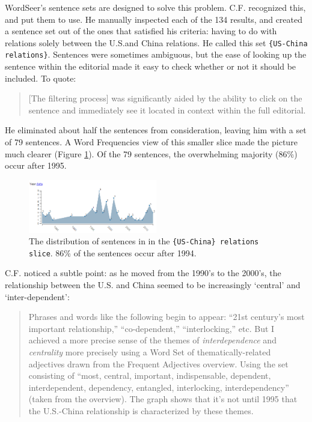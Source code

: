 \documentclass{sig-alternate}
\newcommand{\code}[1] {\texttt{#1}}
\begin{document}
WordSeer's sentence sets are designed to solve this problem. C.F. recognized this, and put them to use. He manually inspected each of the 134 results, and created a sentence set out of the ones that satisfied his criteria: having to do with relations solely between the U.S.and China relations.  He called this set \code{\{US-China relations\}}. Sentences were sometimes ambiguous, but the ease of looking up the sentence within the editorial made it easy to check whether or not it should be included. To quote:
\begin{quote}
[The filtering process] was significantly aided by the ability to click on the sentence and immediately see it located in context within the full editorial.
\end{quote}
He eliminated about half the sentences from consideration, leaving him with a set of  79 sentences. A Word Frequencies view of this smaller slice made the picture much clearer (Figure \ref{fig:chris06}). Of the 79 sentences, the overwhelming majority (86\%) occur after 1995.
\begin{figure}[h!]
\includegraphics[width=0.5\textwidth]{fig/chris/06.png}
\caption{ The distribution of sentences in in the  \code{\{US-China\} relations slice}.  86\% of the sentences occur after 1994. \label{fig:chris06}}
\end{figure}
C.F. noticed a subtle point: as he moved from the 1990's to the 2000's, the relationship between the U.S. and China seemed to be increasingly  `central' and `inter-dependent':
\begin{quote}
Phrases and words like the following begin to appear: ``21st century's most important relationship,'' ``co-dependent,'' ``interlocking,'' etc. But I achieved a more precise sense of the themes of \emph{interdependence} and \emph{centrality } more precisely using a Word Set of thematically-related adjectives drawn from the Frequent Adjectives overview. Using the set consisting of ``most, central, important, indispensable, dependent, interdependent, dependency, entangled, interlocking, interdependency'' (taken from the overview). The graph shows that it's not until 1995 that the U.S.-China relationship is characterized by these themes.
\end{quote}
\end{document}
